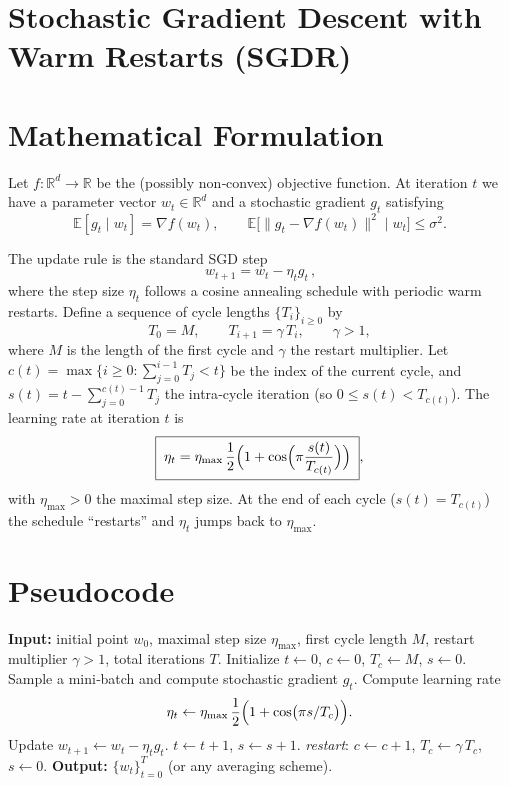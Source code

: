 \documentclass{article}
\begin{document}
\section*{Stochastic Gradient Descent with Warm Restarts (SGDR)}

\section*{Mathematical Formulation}
Let $f:\mathbb{R}^{d}\to\mathbb{R}$ be the (possibly non‑convex) objective function.
At iteration $t$ we have a parameter vector $w_t\in\mathbb{R}^{d}$ and a stochastic
gradient $g_t$ satisfying
\[
\mathbb{E}[g_t\mid w_t]=\nabla f(w_t), \qquad 
\mathbb{E}\!\big[\|g_t-\nabla f(w_t)\|^{2}\mid w_t\big]\le\sigma^{2}.
\]

The update rule is the standard SGD step
\begin{equation}
\boxed{\,w_{t+1}=w_t-\eta_t g_t\,},
\label{eq:update}
\end{equation}
where the step size $\eta_t$ follows a cosine annealing schedule with periodic
warm restarts.  
Define a sequence of cycle lengths $\{T_i\}_{i\ge 0}$ by
\[
T_0=M,\qquad T_{i+1}= \gamma\, T_i,\qquad \gamma>1,
\]
where $M$ is the length of the first cycle and $\gamma$ the restart multiplier.
Let $c(t)=\max\{i\ge0: \sum_{j=0}^{i-1}T_j < t\}$ be the index of the current
cycle, and $s(t)=t-\sum_{j=0}^{c(t)-1}T_j$ the intra‑cycle iteration (so $0\le s(t)<T_{c(t)}$).
The learning rate at iteration $t$ is
\begin{equation}
\boxed{\;
\eta_t = \eta_{\max}\,
\frac{1}{2}\Bigl(1+\cos\Bigl(\pi\frac{s(t)}{T_{c(t)}}\Bigr)\Bigr)
\;},
\label{eq:lr}
\end{equation}
with $\eta_{\max}>0$ the maximal step size.  
At the end of each cycle ($s(t)=T_{c(t)}$) the schedule ``restarts'' and $\eta_t$
jumps back to $\eta_{\max}$.

\section*{Pseudocode}
\begin{algorithm}[H]
\caption{SGDR}
\begin{algorithmic}[1]
\State \textbf{Input:} initial point $w_0$, maximal step size $\eta_{\max}$,
first cycle length $M$, restart multiplier $\gamma>1$, total iterations $T$.
\State Initialize $t\gets 0$, $c\gets 0$, $T_c\gets M$, $s\gets 0$.
    \State Sample a mini‑batch and compute stochastic gradient $g_t$.
    \State Compute learning rate 
    \[
    \eta_t \gets \eta_{\max}\,\frac{1}{2}\Bigl(1+\cos\bigl(\pi s/T_c\bigr)\Bigr).
    \]
    \State Update $w_{t+1}\gets w_t-\eta_t g_t$.
    \State $t\gets t+1$, $s\gets s+1$.
        \State \textit{restart}: $c\gets c+1$, $T_c\gets \gamma\,T_c$, $s\gets 0$.
    \EndIf
\EndWhile
\State \textbf{Output:} $\{w_t\}_{t=0}^{T}$ (or any averaging scheme).
\end{algorithmic}
\end{algorithm}
\end{document}
